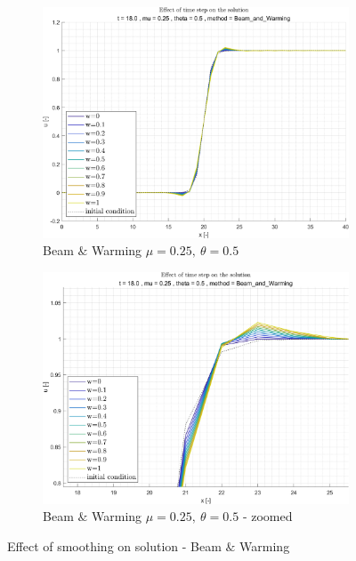 \documentclass[11pt, a4paper]{article}
\begin{document}
\begin{figure}[H]
\begin{subfigure}[c]{.38\textwidth}
    \end{subfigure}
    \begin{subfigure}[c]{.38\textwidth}
        \centering
        \includegraphics[width=\textwidth]{images/grap19.png}
        \caption{Beam $\&$ Warming $\mu=0.25,\ \theta=0.5$}
        \label{fig:Beam & Warming_general_mu0.25_theta0.5_A_diff_w}
    \end{subfigure}
    \begin{subfigure}[c]{.38\textwidth}
        \centering
        \includegraphics[width=\textwidth]{images/grap19.1.png}
        \caption{Beam $\&$ Warming $\mu=0.25,\ \theta=0.5$ - zoomed}
        \label{fig:Beam_&_Warming_general_mu0.25_theta0.5_B_diff_w}
    \end{subfigure}
    \caption{Effect of smoothing on solution - Beam $\&$ Warming}
        \label{fig:Beam_&_Warming_general_diff_w}
\end{figure}
\end{document}
